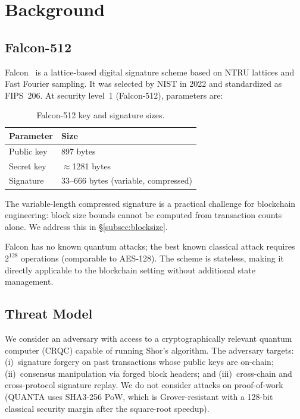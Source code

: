 \documentclass[11pt,a4paper]{article}
\begin{document}
\section{Background}

\subsection{Falcon-512}

Falcon~\cite{falcon2020} is a lattice-based digital signature scheme based on
NTRU lattices and Fast Fourier sampling. It was selected by NIST in 2022 and
standardized as FIPS~206. At security level~1 (Falcon-512), parameters are:

\begin{table}[h]
\centering
\begin{tabular}{@{}ll@{}}
\toprule
\textbf{Parameter} & \textbf{Size} \\
\midrule
Public key  & 897 bytes \\
Secret key  & $\approx$1281 bytes \\
Signature   & 33--666 bytes (variable, compressed) \\
\bottomrule
\end{tabular}
\caption{Falcon-512 key and signature sizes.}
\end{table}

The variable-length compressed signature is a practical challenge for
blockchain engineering: block size bounds cannot be computed from transaction
counts alone. We address this in \S\ref{subsec:blocksize}.

Falcon has no known quantum attacks; the best known classical attack requires
$2^{128}$ operations (comparable to AES-128). The scheme is stateless, making
it directly applicable to the blockchain setting without additional state
management.

\subsection{Threat Model}
\label{subsec:threat}

We consider an adversary with access to a cryptographically relevant quantum
computer (CRQC) capable of running Shor's algorithm. The adversary targets:
(i)~signature forgery on past transactions whose public keys are on-chain;
(ii)~consensus manipulation via forged block headers; and (iii)~cross-chain
and cross-protocol signature replay. We do not consider attacks on
proof-of-work (QUANTA uses SHA3-256 PoW, which is Grover-resistant with a
128-bit classical security margin after the square-root speedup).
\end{document}
